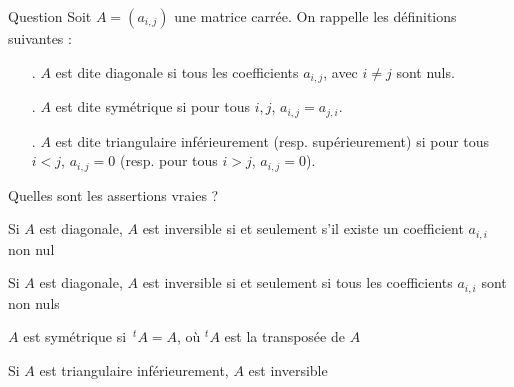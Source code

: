 \begin{multi}[multiple,feedback=
{\(A\) est inversible si et seulement si les vecteurs colonnes sont linéairement indépendants. On en déduit que 
si \(A\) est diagonale, \(A\) est inversible si et seulement si tous les coefficients \(a_{i,i}\) sont non nuls et que si \(A\) est triangulaire (inférieurement ou supérieurement), \(A\) est inversible si et seulement si tous les coefficients \(a_{i,i}\) sont non nuls. Par définition, \(A\) est symétrique si \(\, ^tA=A\).
}]{Question}
Soit \( A=(a_{i,j})\) une matrice carrée. On rappelle les définitions suivantes :
\begin{enumerate}
\item[.] \(A\) est dite diagonale si tous les coefficients \(a_{i,j}\), avec \(i\neq j\) sont nuls.
\item[.] \(A\) est dite symétrique si pour tous \(i,j\), \(a_{i,j}=a_{j,i}\).
\item[.] \(A\) est dite triangulaire inférieurement (resp. supérieurement) si pour tous \(i<j\), \(a_{i,j}=0\) (resp. pour tous \(i>j\), \(a_{i,j}=0\)).
\end{enumerate}
Quelles sont les assertions vraies ?

    \item Si \(A\) est diagonale, \(A\) est inversible si et seulement s'il existe un coefficient \(a_{i,i}\) non nul
    \item* Si \(A\) est diagonale, \(A\) est inversible si et seulement si tous les coefficients \(a_{i,i}\) sont non nuls
    \item* \(A\) est symétrique si \(\, ^tA=A\), où \(^tA\) est la transposée de \(A\)
    \item Si \(A\) est triangulaire inférieurement, \(A\) est inversible
\end{multi}



